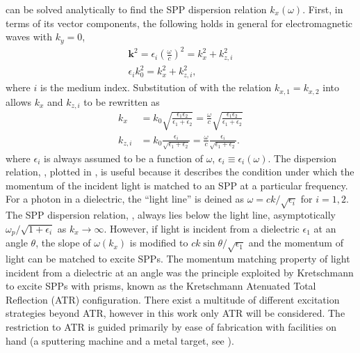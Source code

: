  can be solved analytically to find the SPP
dispersion relation $k_x(\omega)$.
First, in terms of its vector components, the following holds in general
for electromagnetic waves with $k_y=0$,
\begin{align}
\mathbf{k}^2=\epsilon_i \left(\frac{\omega}{c}\right)^2=k_x^2 + k_{z,i}^2\\
\epsilon_i k_0^2=k_x^2 + k_{z,i}^2,
\label{eqn:dispersion1}
\end{align}
where $i$ is the medium index.
Substitution of  with the relation 
$k_{x,1}=k_{x,2}$ into  allows 
$k_x$ and $k_{z,i}$ to be rewritten as
\begin{align}
k_x &= k_0\sqrt{\frac{\epsilon_1 \epsilon_2}{\epsilon_1+\epsilon_2}} 
= \frac{\omega}{c}\sqrt{\frac{\epsilon_1
\epsilon_2}{\epsilon_1+\epsilon_2}} \label{eqn:kayexx}\\
k_{z,i} &= k_0\frac{\epsilon_i}{\sqrt{\epsilon_1+\epsilon_2}}
= \frac{\omega}{c}\frac{\epsilon_i}{\sqrt{\epsilon_1+\epsilon_2}}.
\label{eqn:dandangus}
\end{align}
where $\epsilon_i$ is always assumed to be a function of $\omega$,
$\epsilon_i\equiv\epsilon_i(\omega)$.  The dispersion relation,
, plotted in , is
useful because it describes the condition under which the momentum of the
incident light is matched to an SPP at a particular frequency.  For a
photon in a dielectric, the ``light line'' is deined as $\omega = c k
/\sqrt{\epsilon_i}$ for $i=1,2$.  The SPP dispersion relation,
, always lies below the light line,
asymptotically $\omega_p/\sqrt{1+\epsilon_i}$ as $k_x\to\infty$.
However, if light is incident from a dielectric $\epsilon_1$ at an angle
$\theta$, the slope of $\omega(k_x)$ is modified to $c k \sin
\theta/\sqrt{\epsilon_1}$ and the momentum of light can be matched to
excite SPPs.  The momentum matching property of light incident from a
dielectric at an angle was the principle exploited by Kretschmann
\cite{kretschmann1968} to excite SPPs with prisms, known as the Kretschmann
Atenuated Total Reflection (ATR) configuration.  There exist a multitude of
different excitation strategies beyond ATR, however in this work only ATR
will be considered.  The restriction to ATR is guided primarily by ease of
fabrication with facilities on hand (a sputtering machine and a metal
target, see ).

